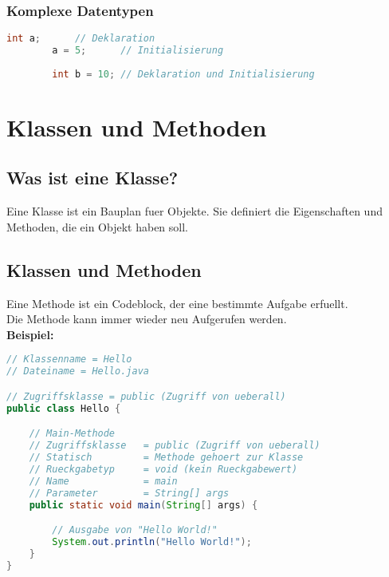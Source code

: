 \documentclass[12pt, a4paper]{article}
\begin{document}
\subsubsection*{Komplexe Datentypen}
\begin{table}[h!]
\end{table}
\begin{lstlisting}[language=java,title=Beispiele]
        int a;      // Deklaration
        a = 5;      // Initialisierung
    
        int b = 10; // Deklaration und Initialisierung    
\end{lstlisting}
\newpage
\section*{Klassen und Methoden}
\subsection*{Was ist eine Klasse?}
Eine Klasse ist ein Bauplan fuer Objekte. Sie definiert die Eigenschaften und \\Methoden, die ein Objekt haben soll.
\subsection*{Klassen und Methoden}
Eine Methode ist ein Codeblock, der eine bestimmte Aufgabe erfuellt.\\
Die Methode kann immer wieder neu Aufgerufen werden. \vspace{0.5cm} \\
\textbf{Beispiel:}
\begin{lstlisting}[language=java,title=Hello.java]
// Klassenname = Hello
// Dateiname = Hello.java

// Zugriffsklasse = public (Zugriff von ueberall)
public class Hello {

    // Main-Methode
    // Zugriffsklasse   = public (Zugriff von ueberall)
    // Statisch         = Methode gehoert zur Klasse
    // Rueckgabetyp     = void (kein Rueckgabewert)
    // Name             = main
    // Parameter        = String[] args
    public static void main(String[] args) {

        // Ausgabe von "Hello World!"
        System.out.println("Hello World!");
    }
}
\end{lstlisting}
\newpage
\end{document}
